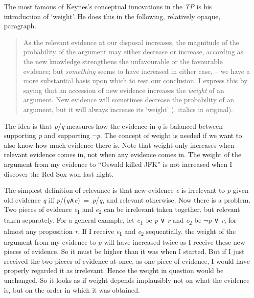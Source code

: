 \documentclass[
  10pt,
  letterpaper,
  DIV=11,
  numbers=noendperiod,
  twoside]{scrartcl}
\begin{document}
The most famous of Keynes's conceptual innovations in the \emph{TP} is
his introduction of `weight'. He does this in the following, relatively
opaque, paragraph.

\begin{quote}
As the relevant evidence at our disposal increases, the magnitude of the
probability of the argument may either decrease or increase, according
as the new knowledge strengthens the unfavourable or the favourable
evidence; but \emph{something} seems to have increased in either case,
-- we have a more substantial basis upon which to rest our conclusion. I
express this by saying that an accession of new evidence increases the
\emph{weight} of an argument. New evidence will sometimes decrease the
probability of an argument, but it will always increase its `weight'
(, italics in original).
\end{quote}

The idea is that \emph{p}/\emph{q} measures how the evidence in \emph{q}
is balanced between supporting \emph{p} and supporting \(\neg\)\emph{p}.
The concept of weight is needed if we want to also know how much
evidence there is. Note that weight only increases when relevant
evidence comes in, not when any evidence comes in. The weight of the
argument from my evidence to ``Oswald killed JFK'' is not increased when
I discover the Red Sox won last night.

The simplest definition of relevance is that new evidence \emph{e} is
irrelevant to \emph{p} given old evidence \emph{q} iff
\emph{p}/(\emph{q}∧\emph{e})~=~\emph{p}/\emph{q}, and relevant
otherwise. Now there is a problem. Two pieces of evidence
\emph{e}\textsubscript{1} and \emph{e}\textsubscript{2} can be
irrelevant taken together, but relevant taken separately. For a general
example, let \emph{e}\textsubscript{1} be \emph{p} ∨ \emph{r} and
\emph{e}\textsubscript{2} be \(\neg\)\emph{p} ∨ \emph{r}, for almost any
proposition \emph{r}. If I receive \emph{e}\textsubscript{1} and
\emph{e}\textsubscript{2} sequentially, the weight of the argument from
my evidence to \emph{p} will have increased twice as I receive these new
pieces of evidence. So it must be higher than it was when I started. But
if I just received the two pieces of evidence at once, as one piece of
evidence, I would have properly regarded it as irrelevant. Hence the
weight in question would be unchanged. So it looks as if weight depends
implausibly not on what the evidence is, but on the order in which it
was obtained.
\end{document}
